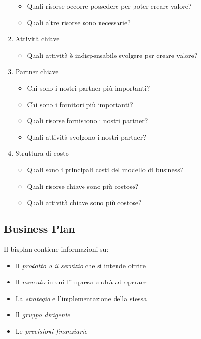\begin{enumerate}
\begin{itemize}
        \item Quali risorse occorre possedere per poter creare valore? 
        \item Quali altre risorse sono necessarie?
    \end{itemize}
    \item Attività chiave
    \begin{itemize}
        \item Quali attività è indispensabile svolgere per creare valore?
    \end{itemize}
    \item Partner chiave
    \begin{itemize}
        \item Chi sono i nostri partner più importanti?
        \item Chi sono i fornitori più importanti?
        \item Quali risorse forniscono i nostri partner? 
        \item Quali attività svolgono i nostri partner?
    \end{itemize}
    \item Struttura di costo
    \begin{itemize}
        \item Quali sono i principali costi del modello
        di business?
        \item Quali risorse chiave sono più costose?
        \item Quali attività chiave sono più costose?
    \end{itemize}
\end{enumerate}

\subsection{Business Plan}

Il \gls{bizplan} contiene informazioni su:
\begin{itemize}
    \item Il \emph{prodotto o il servizio} che si intende offrire
    \item Il \emph{mercato} in cui l’impresa andrà ad operare
    \item La \emph{strategia} e l’implementazione della stessa
    \item Il \emph{gruppo dirigente}
    \item Le \emph{previsioni finanziarie}
\end{itemize}

